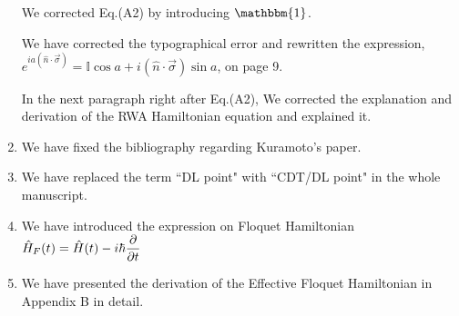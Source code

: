 \documentclass[aps,prb,reprint,showpacs,floatfix,superscriptaddress, onecolumn, 9pt]{revtex4-2}
\begin{document}
\begin{enumerate}
    We corrected Eq.(A2) by introducing $\mathbbm{1}$.

    We have corrected the typographical error and rewritten the expression, 
    $e^{i a\left(\hat{n} \cdot \vec{\sigma}\right)} = \mathbb{I}\cos{a} + i (\hat{n} \cdot \vec{\sigma}) \sin{a}$, on page 9.

    In the next paragraph right after Eq.(A2), We corrected the explanation and derivation of the RWA Hamiltonian equation and explained it.
    
    \item We have fixed the bibliography regarding Kuramoto's paper.
    \item We have replaced the term ``DL point" with ``CDT/DL point" in the whole manuscript.
    
    \item We have introduced the expression on Floquet Hamiltonian $\displaystyle \hat{H}_F(t) = \hat{H}(t) - i\hbar \pdv{t}$
    \item We have presented the derivation of the Effective Floquet Hamiltonian in Appendix B in detail.
\end{enumerate}


\end{document}
